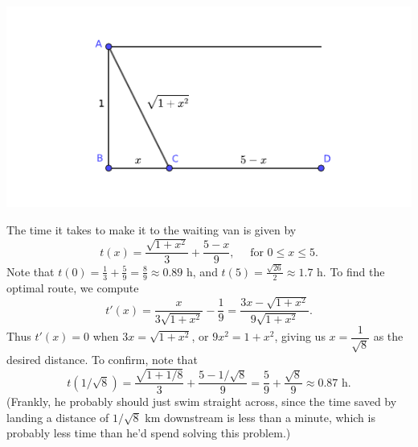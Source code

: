 \documentclass[12pt]{article}
\begin{document}
\begin{enumerate}
\begin{multicols}{2}
\begin{center}
\includegraphics[width=\columnwidth]{Tut8-12sol}
\end{center}
\end{multicols}
The time it takes to make it to the waiting van is given by
\[
t(x) = \frac{\sqrt{1+x^2}}{3}+\frac{5-x}{9}, \quad \text{ for } 0\leq x\leq 5.
\]
Note that $t(0)=\frac13+\frac59=\frac89\approx 0.89$ h, and $t(5) = \frac{\sqrt{26}}{2} \approx 1.7$ h. To find the optimal route, we compute
\[
t'(x) = \frac{x}{3\sqrt{1+x^2}}-\frac19 = \frac{3x-\sqrt{1+x^2}}{9\sqrt{1+x^2}}.
\]
Thus $t'(x)=0$ when $3x=\sqrt{1+x^2}$, or $9x^2=1+x^2$, giving us $x=\dfrac{1}{\sqrt{8}}$ as the desired distance. To confirm, note that
\[
t(1/\sqrt{8}) = \frac{\sqrt{1+1/8}}{3}+\frac{5-1/\sqrt{8}}{9}=\frac59+\frac{\sqrt{8}}{9}\approx 0.87 \text{ h}.
\]
(Frankly, he probably should just swim straight across, since the time saved by landing a distance of $1/\sqrt{8}$ km downstream is less than a minute, which is probably less time than he'd spend solving this problem.)
\end{enumerate}
\newpage
\end{document}
